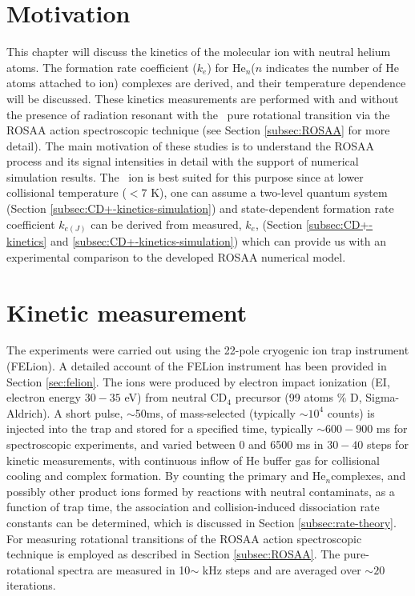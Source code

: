 \section{Motivation}
\label{sec:CD+-kinetics-motivation}

This chapter will discuss the kinetics of the \CD molecular ion with neutral
helium atoms. The formation rate coefficient ($k_e$) for He$_n$\CD ($n$
indicates the number of He atoms attached to \CD ion) complexes are derived,
and their temperature dependence will be discussed. These kinetics measurements
are performed with and without the presence of radiation resonant with the \CD\
\CDline pure rotational transition via the ROSAA action spectroscopic technique
(see Section \ref{subsec:ROSAA} for more detail). The main motivation of these
studies is to understand the ROSAA process and its signal intensities in detail
with the support of numerical simulation results. The \CD\ ion is best suited
for this purpose since at lower collisional temperature ($<7$ K), one can
assume a two-level quantum system (Section
\ref{subsec:CD+-kinetics-simulation}) and state-dependent formation rate
coefficient $k_{e(J)}$ can be derived from measured, $k_e$, (Section
\ref{subsec:CD+-kinetics} and \ref{subsec:CD+-kinetics-simulation}) which can
provide us with an experimental comparison to the developed ROSAA numerical
model.

\section{Kinetic measurement}
\label{sec:CD+-kinetics}
The experiments were carried out using the 22-pole cryogenic ion trap instrument (FELion). A detailed account of the FELion instrument has been provided in Section \ref{sec:felion}. The \CD ions were produced by electron impact ionization (EI, electron energy $30-35$ eV) from neutral CD$_4$ precursor (99 atoms \% D, Sigma-Aldrich). A short pulse, $\sim$50ms, of mass-selected \CD (typically $\sim 10^4$ counts) is injected into the trap and stored for a specified time, typically $\sim 600-900$ ms for spectroscopic experiments, and varied between 0 and 6500 ms in $30-40$ steps for kinetic measurements, with continuous inflow of He buffer gas for collisional cooling and complex formation. By counting the primary \CD and He$_n$\CD complexes, and possibly other product ions formed by reactions with neutral contaminats, as a function of trap time, the association and collision-induced dissociation rate constants can be determined, which is discussed in Section \ref{subsec:rate-theory}. For measuring rotational transitions of \CD the ROSAA action spectroscopic technique is employed as described in Section \ref{subsec:ROSAA}. The pure-rotational spectra are measured in 10$\sim$ kHz steps and are averaged over $\sim 20$ iterations.

